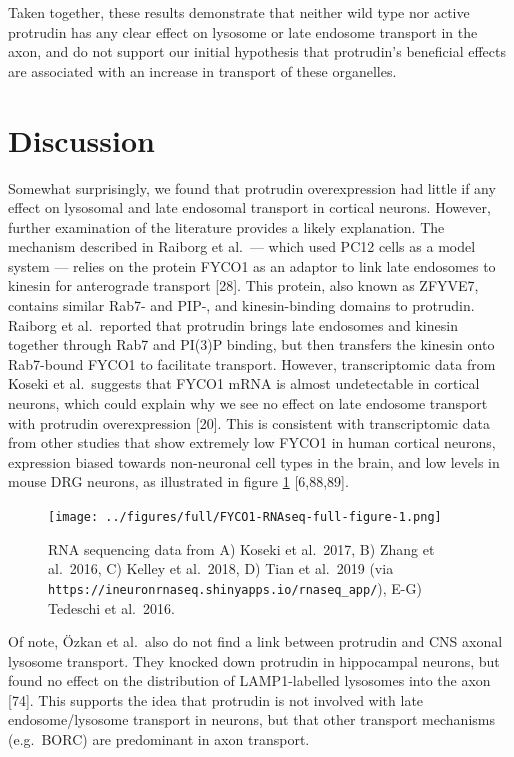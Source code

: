 \documentclass[
  12pt,
  a4paper,
]{book}
\begin{document}
Taken together, these results demonstrate that neither wild type nor active protrudin has any clear effect on lysosome or late endosome transport in the axon, and do not support our initial hypothesis that protrudin's beneficial effects are associated with an increase in transport of these organelles.

\hypertarget{no-FYCO}{%
\section{Discussion}\label{no-FYCO}}

Somewhat surprisingly, we found that protrudin overexpression had little if any effect on lysosomal and late endosomal transport in cortical neurons. However, further examination of the literature provides a likely explanation. The mechanism described in Raiborg et al.~--- which used PC12 cells as a model system --- relies on the protein FYCO1 as an adaptor to link late endosomes to kinesin for anterograde transport {[}28{]}. This protein, also known as ZFYVE7, contains similar Rab7- and PIP-, and kinesin-binding domains to protrudin. Raiborg et al.~reported that protrudin brings late endosomes and kinesin together through Rab7 and PI(3)P binding, but then transfers the kinesin onto Rab7-bound FYCO1 to facilitate transport. However, transcriptomic data from Koseki et al.~suggests that FYCO1 mRNA is almost undetectable in cortical neurons, which could explain why we see no effect on late endosome transport with protrudin overexpression {[}20{]}. This is consistent with transcriptomic data from other studies that show extremely low FYCO1 in human cortical neurons, expression biased towards non-neuronal cell types in the brain, and low levels in mouse DRG neurons, as illustrated in figure \ref{fig:FYCO1-RNAseq-full-figure} {[}6,88,89{]}.

\begin{figure}
\centering
\texttt{[image: ../figures/full/FYCO1-RNAseq-full-figure-1.png]}
\caption{\label{fig:FYCO1-RNAseq-full-figure}RNA sequencing data from A) Koseki et al.~2017, B) Zhang et al.~2016, C) Kelley et al.~2018, D) Tian et al.~2019 (via \texttt{https://ineuronrnaseq.shinyapps.io/rnaseq\_app/}), E-G) Tedeschi et al.~2016.}
\end{figure}

Of note, Özkan et al.~also do not find a link between protrudin and CNS axonal lysosome transport. They knocked down protrudin in hippocampal neurons, but found no effect on the distribution of LAMP1-labelled lysosomes into the axon {[}74{]}. This supports the idea that protrudin is not involved with late endosome/lysosome transport in neurons, but that other transport mechanisms (e.g.~BORC) are predominant in axon transport.
\end{document}
